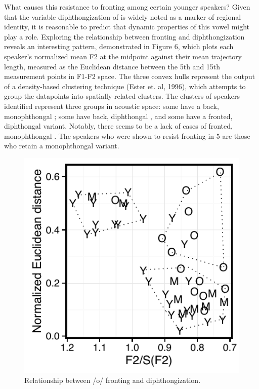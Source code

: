\documentclass[12pt]{article}
\begin{document}
What causes this resistance to fronting among certain younger speakers? Given that the variable diphthongization of  is widely noted as a marker of regional identity, it is reasonable to predict that dynamic properties of this vowel might play a role. Exploring the relationship between fronting and diphthongization reveals an interesting pattern, demonstrated in Figure 6, which plots each speaker's normalized mean F2 at the midpoint against their mean trajectory length, measured as the Euclidean distance between the 5th and 15th measurement points in F1-F2 space. The three convex hulls represent the output of a density-based clustering technique (Ester et. al, 1996), which attempts to group the datapoints into spatially-related clusters. The clusters of speakers identified represent three groups in acoustic space: some have a back, monophthongal ; some have back, diphthongal , and some have a fronted, diphthongal variant. Notably, there seems to be a lack of cases of fronted, monophthongal . The speakers who were shown to resist fronting in 5 are those who retain a monophthongal variant.

\vspace*{6pt}
\begin{figure}[H]
\centering
\includegraphics[scale=0.85]{ofrontingdip.pdf}
\caption{Relationship between /o/ fronting and diphthongization.}
\end{figure}
\vspace*{6pt}
\end{document}
